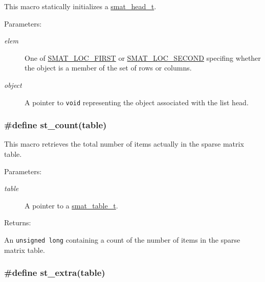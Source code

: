 This macro statically initializes a \hyperlink{group__dbprim__smat_a1}{smat\_\-head\_\-t}.\begin{Desc}
\item[Parameters: ]\par
\begin{description}
\item[{\em 
elem}]One of \hyperlink{group__dbprim__smat_a47a135}{SMAT\_\-LOC\_\-FIRST} or \hyperlink{group__dbprim__smat_a47a136}{SMAT\_\-LOC\_\-SECOND} specifing whether the object is a member of the set of rows or columns. \item[{\em 
object}]A pointer to {\tt void} representing the object associated with the list head. \end{description}
\end{Desc}
\hypertarget{group__dbprim__smat_a25}{
\subsubsection[st\_\-count]{\setlength{\rightskip}{0pt plus 5cm}\#define st\_\-count(table)}}
\label{group__dbprim__smat_a25}


This macro retrieves the total number of items actually in the sparse matrix table.\begin{Desc}
\item[Parameters: ]\par
\begin{description}
\item[{\em 
table}]A pointer to a \hyperlink{group__dbprim__smat_a0}{smat\_\-table\_\-t}.\end{description}
\end{Desc}
\begin{Desc}
\item[Returns: ]\par
An {\tt unsigned long} containing a count of the number of items in the sparse matrix table. \end{Desc}
\hypertarget{group__dbprim__smat_a26}{
\subsubsection[st\_\-extra]{\setlength{\rightskip}{0pt plus 5cm}\#define st\_\-extra(table)}}
\label{group__dbprim__smat_a26}


